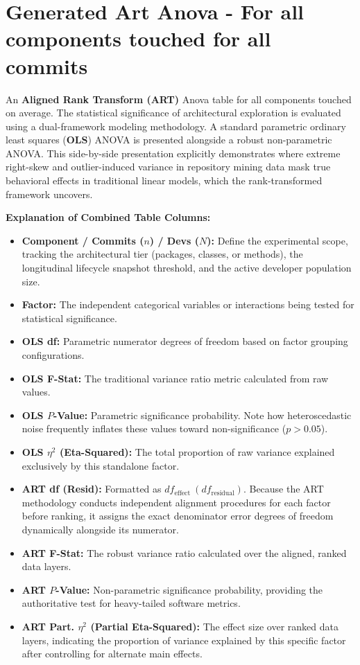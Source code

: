 \section{Generated Art Anova - For all components touched for all commits} 
An \textbf{Aligned Rank Transform (ART)} Anova table for all components touched on average. 
The statistical significance of architectural exploration is evaluated using a dual-framework modeling methodology. A standard parametric ordinary least squares (\textbf{OLS}) ANOVA is presented alongside a robust non-parametric ANOVA. This side-by-side presentation explicitly demonstrates where extreme right-skew and outlier-induced variance in repository mining data mask true behavioral effects in traditional linear models, which the rank-transformed framework uncovers.

\textbf{Explanation of Combined Table Columns:}
\begin{itemize}
    \item \textbf{Component / Commits ($n$) / Devs ($N$):} Define the experimental scope, tracking the architectural tier (packages, classes, or methods), the longitudinal lifecycle snapshot threshold, and the active developer population size.
    \item \textbf{Factor:} The independent categorical variables or interactions being tested for statistical significance.
    
    \item \textbf{OLS df:} Parametric numerator degrees of freedom based on factor grouping configurations.
    \item \textbf{OLS F-Stat:} The traditional variance ratio metric calculated from raw values.
    \item \textbf{OLS $P$-Value:} Parametric significance probability. Note how heteroscedastic noise frequently inflates these values toward non-significance ($p > 0.05$).
    \item \textbf{OLS $\eta^2$ (Eta-Squared):} The total proportion of raw variance explained exclusively by this standalone factor.
    
    \item \textbf{ART df (Resid):} Formatted as $df_{\mathrm{effect}}~(df_{\mathrm{residual}})$. Because the ART methodology conducts independent alignment procedures for each factor before ranking, it assigns the exact denominator error degrees of freedom dynamically alongside its numerator.
    \item \textbf{ART F-Stat:} The robust variance ratio calculated over the aligned, ranked data layers.
    \item \textbf{ART $P$-Value:} Non-parametric significance probability, providing the authoritative test for heavy-tailed software metrics.
    \item \textbf{ART Part. $\eta^2$ (Partial Eta-Squared):} The effect size over ranked data layers, indicating the proportion of variance explained by this specific factor after controlling for alternate main effects.
\end{itemize}

